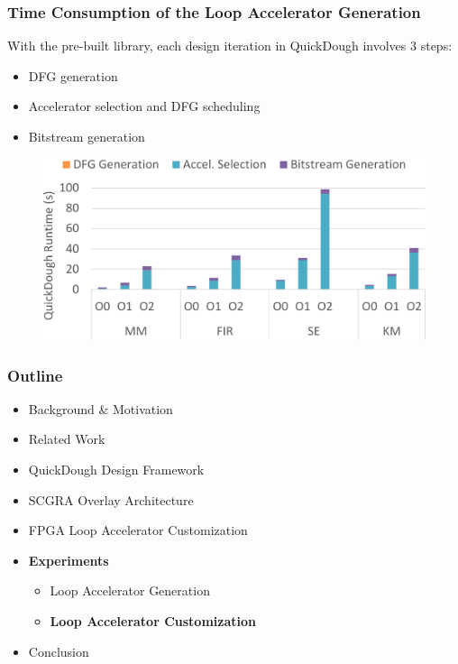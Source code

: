 \documentclass[accentcolor=tud1a,colorbacktitle,inverttitle,landscape,german,presentation,t]{tudbeamer}
\begin{document}
  \begin{frame}
  \frametitle{Time Consumption of the Loop Accelerator Generation}
  \vspace{-0.8em}
  With the pre-built library, each design iteration in QuickDough involves 3 steps:
  \begin{itemize}
    \item DFG generation
    \item Accelerator selection and DFG scheduling
    \item Bitstream generation
  \end{itemize}
  \begin{figure}
    \includegraphics[width=0.8\linewidth]{quickdough-runtime}
  \end{figure}
  \end{frame}

  \begin{frame}
  \frametitle{Outline}
  \begin{itemize}
  \setlength{\itemsep}{6pt}
  \item Background \& Motivation
  \item Related Work
  \item QuickDough Design Framework
  \item SCGRA Overlay Architecture
  \item FPGA Loop Accelerator Customization
  \item \textbf{Experiments}
  \begin{itemize}
    \setlength{\itemsep}{6pt}
    \item Loop Accelerator Generation
    \item \textbf{Loop Accelerator Customization}
  \end{itemize}
  \item Conclusion
  \end{itemize}
  \end{frame}
\end{document}
